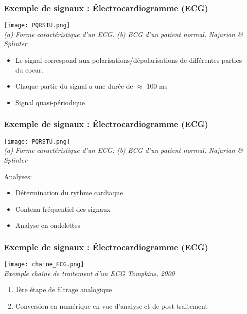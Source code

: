 \documentclass{beamer}
\begin{document}
\begin{frame}
\frametitle{Exemple de signaux : \'Electrocardiogramme (ECG)}
\begin{center}
\texttt{[image: PQRSTU.png]}\\
\textit{\footnotesize (a) Forme caractéristique d'un ECG. (b) ECG d'un patient normal. Najarian \& Splinter}
\end{center}
\begin{itemize}
\item Le signal correspond aux polarisations/dépolarisations de différentes parties du coeur.
\item Chaque partie du signal a une durée de $\approx$ 100 ms
\item Signal quasi-périodique
\end{itemize}
\end{frame}

\begin{frame}
\frametitle{Exemple de signaux : \'Electrocardiogramme (ECG)}
\begin{center}
\texttt{[image: PQRSTU.png]}\\
\textit{\footnotesize (a) Forme caractéristique d'un ECG. (b) ECG d'un patient normal. Najarian \& Splinter}
\end{center}
Analyses: 
\vspace{0.1cm}
\begin{itemize}
\item Détermination du rythme cardiaque
\vspace{0.1cm}
\item Contenu fréquentiel des signaux
\vspace{0.1cm} 
\item Analyse en ondelettes
\end{itemize}
\end{frame}

\begin{frame}
\frametitle{Exemple de signaux : \'Electrocardiogramme (ECG)}
\begin{center}
\texttt{[image: chaine\_ECG.png]}\\
\textit{\footnotesize Exemple chaîne de traitement d'un ECG Tompkins, 2000}
\end{center}
\begin{enumerate}
\item 1ère étape de filtrage analogique
\item Conversion en numérique en vue d'analyse et de post-traitement
\end{enumerate}
\end{frame}
\end{document}
